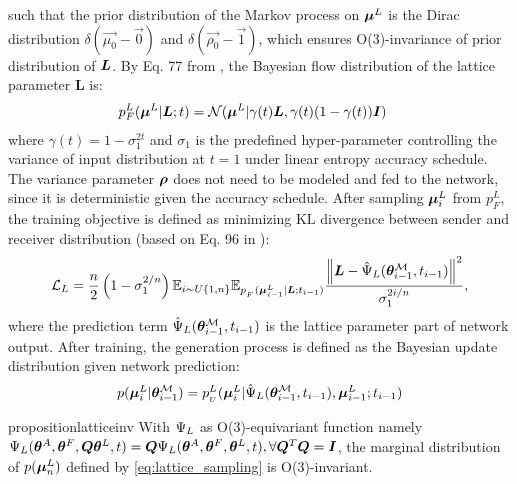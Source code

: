 such that the prior distribution of the Markov process on ${\bm{\mu}}^L$ is the Dirac distribution $\delta(\vec{\mu_0}-\vec{0})$ and $\delta(\vec{\rho_0}-\vec{1})$, 
which ensures O(3)-invariance of prior distribution of ${\bm{L}}$. By Eq. 77 from \citet{bfn}, the Bayesian flow distribution of the lattice parameter $\bm{L}$ is: 
\begin{align}%
p_F^L(\bmuL|\bm{L};t) &=\mathcal{N}(\bmuL|\gamma(t)\bm{L},\gamma(t)(1-\gamma(t))\bm{I}) 
\end{align}
where $\gamma(t) = 1 - \sigma_1^{2t}$ and $\sigma_1$ is the predefined hyper-parameter controlling the variance of input distribution at $t=1$ under linear entropy accuracy schedule. The variance parameter ${\bm{\rho}}$ does not need to be modeled and fed to the network, since it is deterministic given the accuracy schedule. After sampling $\bm{\mu}^L_i$ from $p_F^L$, the training objective is defined as minimizing KL divergence between sender and receiver distribution (based on Eq. 96 in \citet{bfn}):
\begin{align}
\mathcal{L}_{L} = \frac{n}{2}\left(1-\sigma_1^{2/n}\right)\mathbb{E}_{i \sim U\{1,n\}}\mathbb{E}_{p_{_F}(\bm{\mu}^L_{i-1} |{\bm{L}} ; t_{i-1})}  \frac{\left\|{\bm{L}} -\hat{\Psi}_L(\bm{\theta}^\mathcal{M}_{i-1}, t_{i-1})\right\|^2}{\sigma_1^{2i/n}},\label{eq:lattice_loss}
\end{align}
where the prediction term $\hat{\Psi}_L(\bm{\theta}^\mathcal{M}_{i-1}, t_{i-1})$ is the lattice parameter part of network output. After training, the generation process is defined as the Bayesian update distribution given network prediction:
\begin{equation}\label{eq:lattice_sampling}
    p(\bm{\mu}^L_{i}|\boldsymbol{\theta}_{i-1}^{\mathcal{M}})=p_{_U}^L(\bm{\mu}^L_{i}|\hat{\Psi}_L(\bm{\theta}^\mathcal{M}_{i-1}, t_{i-1}),\bm{\mu}^L_{i-1};t_{i-1})
\end{equation}
    


\begin{restatable}{proposition}{latticeinv}\label{prop:latticeinv}
With $\Psi_{L}$ as  O(3)-equivariant function namely $\Psi_L(\boldsymbol{\theta}_{}^A,\boldsymbol{\theta}_{}^F,{\bm{Q}}\boldsymbol{\theta}_{}^L,t)={\bm{Q}}\Psi_L(\boldsymbol{\theta}_{}^A,\boldsymbol{\theta}_{}^F,\boldsymbol{\theta}_{}^L,t),\forall{\bm{Q}}^T{\bm{Q}}={\bm{I}}$, the marginal distribution of $p(\bm{\mu}^L_n)$ defined by \cref{eq:lattice_sampling} is O(3)-invariant. 
\end{restatable}


